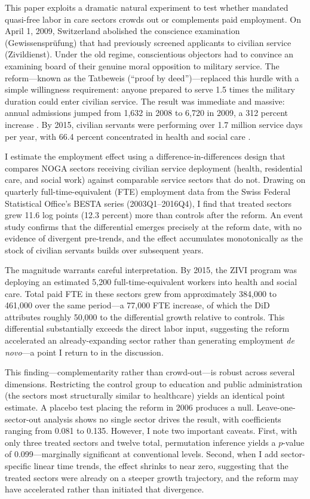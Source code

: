 \documentclass[12pt]{article}
\begin{document}
This paper exploits a dramatic natural experiment to test whether mandated quasi-free labor in care sectors crowds out or complements paid employment. On April 1, 2009, Switzerland abolished the conscience examination (Gewissensprüfung) that had previously screened applicants to civilian service (Zivildienst). Under the old regime, conscientious objectors had to convince an examining board of their genuine moral opposition to military service. The reform---known as the Tatbeweis (``proof by deed'')---replaced this hurdle with a simple willingness requirement: anyone prepared to serve 1.5 times the military duration could enter civilian service. The result was immediate and massive: annual admissions jumped from 1,632 in 2008 to 6,720 in 2009, a 312 percent increase \citep{zivi2010, zivi2016}. By 2015, civilian servants were performing over 1.7 million service days per year, with 66.4 percent concentrated in health and social care \citep{zivi2016}.

I estimate the employment effect using a difference-in-differences design that compares NOGA sectors receiving civilian service deployment (health, residential care, and social work) against comparable service sectors that do not. Drawing on quarterly full-time-equivalent (FTE) employment data from the Swiss Federal Statistical Office's BESTA series (2003Q1--2016Q4), I find that treated sectors grew 11.6 log points (12.3 percent) more than controls after the reform. An event study confirms that the differential emerges precisely at the reform date, with no evidence of divergent pre-trends, and the effect accumulates monotonically as the stock of civilian servants builds over subsequent years.

The magnitude warrants careful interpretation. By 2015, the ZIVI program was deploying an estimated 5,200 full-time-equivalent workers into health and social care. Total paid FTE in these sectors grew from approximately 384,000 to 461,000 over the same period---a 77,000 FTE increase, of which the DiD attributes roughly 50,000 to the differential growth relative to controls. This differential substantially exceeds the direct labor input, suggesting the reform accelerated an already-expanding sector rather than generating employment \textit{de novo}---a point I return to in the discussion.

This finding---complementarity rather than crowd-out---is robust across several dimensions. Restricting the control group to education and public administration (the sectors most structurally similar to healthcare) yields an identical point estimate. A placebo test placing the reform in 2006 produces a null. Leave-one-sector-out analysis shows no single sector drives the result, with coefficients ranging from 0.081 to 0.135. However, I note two important caveats. First, with only three treated sectors and twelve total, permutation inference yields a $p$-value of 0.099---marginally significant at conventional levels. Second, when I add sector-specific linear time trends, the effect shrinks to near zero, suggesting that the treated sectors were already on a steeper growth trajectory, and the reform may have accelerated rather than initiated that divergence.
\end{document}
